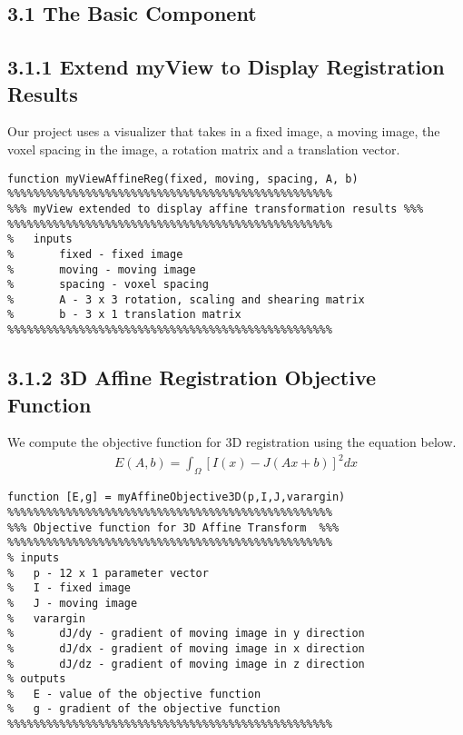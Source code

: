 \documentclass{article}
\begin{document}
	\begin{par}
		\section*{3.1 The Basic Component}
		\subsection*{3.1.1 Extend myView to Display Registration Results}
			Our project uses a visualizer that takes in a fixed image, a moving image, the voxel spacing in the image, a rotation matrix and a translation vector. 
			\begin{lstlisting}
function myViewAffineReg(fixed, moving, spacing, A, b)
%%%%%%%%%%%%%%%%%%%%%%%%%%%%%%%%%%%%%%%%%%%%%%%%%%
%%% myView extended to display affine transformation results %%%
%%%%%%%%%%%%%%%%%%%%%%%%%%%%%%%%%%%%%%%%%%%%%%%%%%
% 	inputs 
%		fixed - fixed image                                     
%		moving - moving image                                   
%		spacing - voxel spacing                                 
%		A - 3 x 3 rotation, scaling and shearing matrix         
%		b - 3 x 1 translation matrix                            
%%%%%%%%%%%%%%%%%%%%%%%%%%%%%%%%%%%%%%%%%%%%%%%%%%
			\end{lstlisting}
			
		\subsection*{3.1.2 3D Affine Registration Objective Function}
			We compute the objective function for 3D registration using the equation below.
			\begin{align*}
				E(A,b) = \int_{\Omega} [ I(x) - J(Ax+b)]^{2} dx
			\end{align*}

			\begin{lstlisting}
function [E,g] = myAffineObjective3D(p,I,J,varargin)
%%%%%%%%%%%%%%%%%%%%%%%%%%%%%%%%%%%%%%%%%%%%%%%%%%
%%% Objective function for 3D Affine Transform  %%%
%%%%%%%%%%%%%%%%%%%%%%%%%%%%%%%%%%%%%%%%%%%%%%%%%%
% inputs
% 	p - 12 x 1 parameter vector                     
% 	I - fixed image                                 
% 	J - moving image                                
% 	varargin 
% 		dJ/dy - gradient of moving image in y direction 
% 		dJ/dx - gradient of moving image in x direction 
% 		dJ/dz - gradient of moving image in z direction 
% outputs                                 
% 	E - value of the objective function             
% 	g - gradient of the objective function          
%%%%%%%%%%%%%%%%%%%%%%%%%%%%%%%%%%%%%%%%%%%%%%%%%%
			\end{lstlisting}


\end{par}
\end{document}
